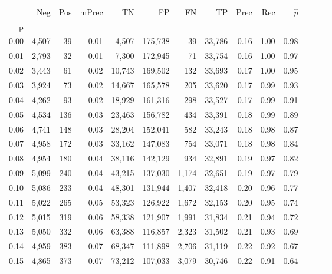 \begin{tabular}{rrrrrrrrrrrrrr}
\toprule
{} &    Neg &  Pos & mPrec &       TN &       FP &      FN &      TP &  Prec &   Rec & $\hat{p}$ \\
p    &        &      &       &          &          &         &         &       &       &           \\
\midrule
0.00 &  4,507 &   39 &  0.01 &    4,507 &  175,738 &      39 &  33,786 &  0.16 &  1.00 &      0.98 \\
0.01 &  2,793 &   32 &  0.01 &    7,300 &  172,945 &      71 &  33,754 &  0.16 &  1.00 &      0.97 \\
0.02 &  3,443 &   61 &  0.02 &   10,743 &  169,502 &     132 &  33,693 &  0.17 &  1.00 &      0.95 \\
0.03 &  3,924 &   73 &  0.02 &   14,667 &  165,578 &     205 &  33,620 &  0.17 &  0.99 &      0.93 \\
0.04 &  4,262 &   93 &  0.02 &   18,929 &  161,316 &     298 &  33,527 &  0.17 &  0.99 &      0.91 \\
0.05 &  4,534 &  136 &  0.03 &   23,463 &  156,782 &     434 &  33,391 &  0.18 &  0.99 &      0.89 \\
0.06 &  4,741 &  148 &  0.03 &   28,204 &  152,041 &     582 &  33,243 &  0.18 &  0.98 &      0.87 \\
0.07 &  4,958 &  172 &  0.03 &   33,162 &  147,083 &     754 &  33,071 &  0.18 &  0.98 &      0.84 \\
0.08 &  4,954 &  180 &  0.04 &   38,116 &  142,129 &     934 &  32,891 &  0.19 &  0.97 &      0.82 \\
0.09 &  5,099 &  240 &  0.04 &   43,215 &  137,030 &   1,174 &  32,651 &  0.19 &  0.97 &      0.79 \\
0.10 &  5,086 &  233 &  0.04 &   48,301 &  131,944 &   1,407 &  32,418 &  0.20 &  0.96 &      0.77 \\
0.11 &  5,022 &  265 &  0.05 &   53,323 &  126,922 &   1,672 &  32,153 &  0.20 &  0.95 &      0.74 \\
0.12 &  5,015 &  319 &  0.06 &   58,338 &  121,907 &   1,991 &  31,834 &  0.21 &  0.94 &      0.72 \\
0.13 &  5,050 &  332 &  0.06 &   63,388 &  116,857 &   2,323 &  31,502 &  0.21 &  0.93 &      0.69 \\
0.14 &  4,959 &  383 &  0.07 &   68,347 &  111,898 &   2,706 &  31,119 &  0.22 &  0.92 &      0.67 \\
0.15 &  4,865 &  373 &  0.07 &   73,212 &  107,033 &   3,079 &  30,746 &  0.22 &  0.91 &      0.64 \\

\end{tabular}
